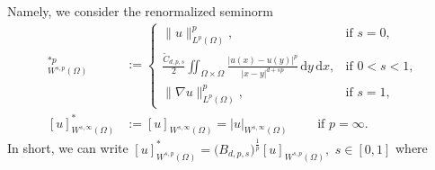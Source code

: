\documentclass[12pt, reqno]{amsart}%
\theoremstyle{plain}  %
\theoremstyle{definition}  %
\theoremstyle{remark}
\numberwithin{equation}{section}
\renewcommand{\d}{\,\mathrm{d}}
\begin{document}
 Namely, we consider the renormalized seminorm
\begin{align*}
[u]^{*p}_{W^{s,p}(\Omega)}
& :=
\begin{cases}
\|u\|_{L^p(\Omega)}^p, & \text{if } s = 0, \\
\displaystyle \frac{\widetilde{C}_{d,p,s}}{2} \iint_{\Omega\times\Omega}
\frac{|u(x) - u(y)|^p}{|x - y|^{d + sp}}\d y\d x, & \text{if } 0 < s < 1, \\
\|\nabla u\|_{L^p(\Omega)}^p, & \text{if } s = 1,
\end{cases}\\
[u]^{*}_{W^{s,\infty}(\Omega)} &:=[u]_{W^{s,\infty}(\Omega)}=|u|_{W^{s,\infty}(\Omega)}
\qquad \text{ if } p=\infty.
\end{align*}
In short, we can write $[u]^{*}_{W^{s,p}(\Omega)} =\big(B_{d,p,s}\big)^{\frac{1}{p}}[u]_{W^{s,p}(\Omega)},$ $s\in [0,1]$
where
\end{document}
